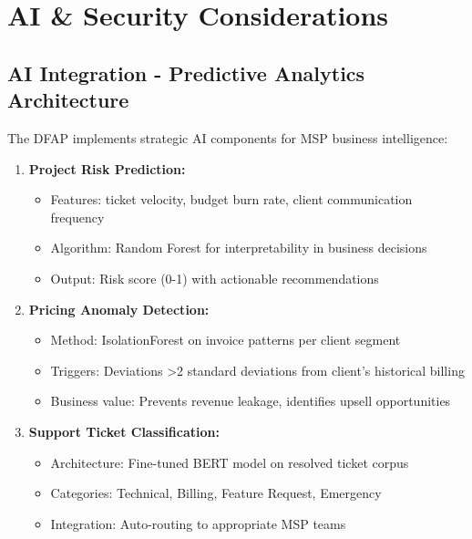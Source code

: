 \section{AI \& Security Considerations}

\subsection{AI Integration - Predictive Analytics Architecture}

The DFAP implements strategic AI components for MSP business intelligence:

\begin{enumerate}
  \item \textbf{Project Risk Prediction:} 
    \begin{itemize}
      \item Features: ticket velocity, budget burn rate, client communication frequency
      \item Algorithm: Random Forest for interpretability in business decisions
      \item Output: Risk score (0-1) with actionable recommendations
    \end{itemize}
    
  \item \textbf{Pricing Anomaly Detection:} 
    \begin{itemize}
      \item Method: IsolationForest on invoice patterns per client segment
      \item Triggers: Deviations >2 standard deviations from client's historical billing
      \item Business value: Prevents revenue leakage, identifies upsell opportunities
    \end{itemize}
    
  \item \textbf{Support Ticket Classification:}
    \begin{itemize}
      \item Architecture: Fine-tuned BERT model on resolved ticket corpus
      \item Categories: Technical, Billing, Feature Request, Emergency
      \item Integration: Auto-routing to appropriate MSP teams
    \end{itemize}
\end{enumerate}

